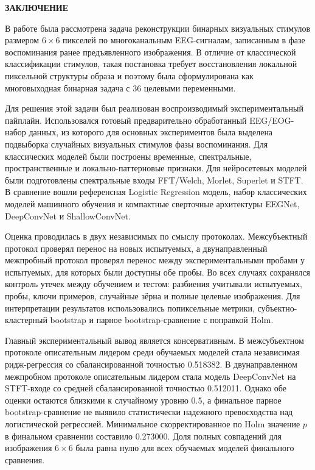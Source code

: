 \newpage
\begin{center}
  \textbf{\large ЗАКЛЮЧЕНИЕ}
\end{center}

В работе была рассмотрена задача реконструкции бинарных визуальных стимулов
размером $6 \times 6$ пикселей по многоканальным EEG-сигналам, записанным в
фазе воспоминания ранее предъявленного изображения. В отличие от классической
классификации стимулов, такая постановка требует восстановления локальной
пиксельной структуры образа и поэтому была сформулирована как многовыходная
бинарная задача с 36 целевыми переменными.

Для решения этой задачи был реализован воспроизводимый экспериментальный
пайплайн. Использовался готовый предварительно обработанный EEG/EOG-набор
данных, из которого для основных экспериментов была выделена подвыборка
случайных визуальных стимулов фазы воспоминания. Для классических моделей
были построены временные, спектральные, пространственные и локально-паттерновые
признаки. Для нейросетевых моделей были подготовлены спектральные входы
FFT/Welch, Morlet, Superlet и STFT. В сравнение вошли референсная Logistic
Regression модель, набор классических моделей машинного обучения и компактные
сверточные архитектуры EEGNet, DeepConvNet и ShallowConvNet.

Оценка проводилась в двух независимых по смыслу протоколах. Межсубъектный
протокол проверял перенос на новых испытуемых, а двунаправленный межпробный
протокол проверял перенос между экспериментальными пробами у испытуемых, для
которых были доступны обе пробы. Во всех случаях сохранялся контроль утечек
между обучением и тестом: разбиения учитывали испытуемых, пробы, ключи
примеров, случайные зёрна и полные целевые изображения. Для интерпретации
результатов использовались попиксельные метрики, субъектно-кластерный
bootstrap и парное bootstrap-сравнение с поправкой Holm.

Главный экспериментальный вывод является консервативным. В межсубъектном
протоколе описательным лидером среди обучаемых моделей стала независимая
ридж-регрессия со сбалансированной точностью 0.518382. В двунаправленном
межпробном протоколе описательным лидером стала модель DeepConvNet на
STFT-входе со средней сбалансированной точностью 0.512011. Однако обе оценки
остаются близкими к случайному уровню 0.5, а финальное парное
bootstrap-сравнение не выявило статистически надежного превосходства над
логистической регрессией. Минимальное скорректированное по Holm значение
$p$ в финальном сравнении составило 0.273000. Доля полных совпадений для
изображения $6 \times 6$ была равна нулю для всех обучаемых моделей
финального сравнения.


